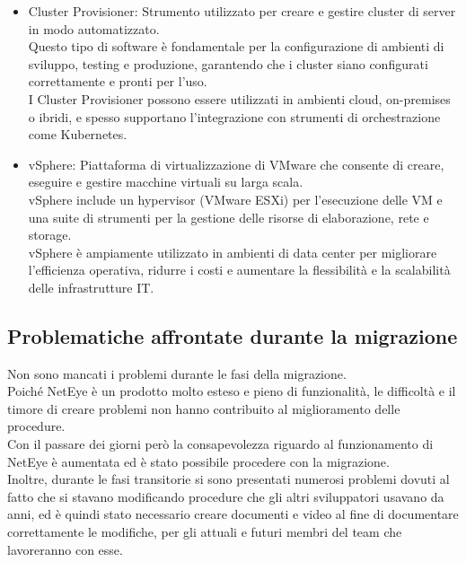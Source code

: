 \begin{itemize}
  \item Cluster Provisioner: Strumento utilizzato per creare e gestire cluster
    di server in modo automatizzato.\\ Questo tipo di software è fondamentale
    per la configurazione di ambienti di sviluppo, testing e produzione,
    garantendo che i cluster siano configurati correttamente e pronti per l'uso.\\
    I Cluster Provisioner possono essere utilizzati in ambienti cloud, on-premises
    o ibridi, e spesso supportano l'integrazione con strumenti di orchestrazione
    come Kubernetes.

  \item vSphere: Piattaforma di virtualizzazione di VMware che consente di
    creare, eseguire e gestire macchine virtuali su larga scala.\\ vSphere include
    un hypervisor (VMware ESXi) per l'esecuzione delle VM e una suite di strumenti
    per la gestione delle risorse di elaborazione, rete e storage.\\ vSphere è
    ampiamente utilizzato in ambienti di data center per migliorare l'efficienza
    operativa, ridurre i costi e aumentare la flessibilità e la scalabilità delle
    infrastrutture IT.
\end{itemize}

\subsection{Problematiche affrontate durante la migrazione}
\label{sub:problemi}

Non sono mancati i problemi durante le fasi della migrazione.\\ Poiché NetEye è un
prodotto molto esteso e pieno di funzionalità, le difficoltà e il timore di
creare problemi non hanno contribuito al miglioramento delle procedure.\\ Con il
passare dei giorni però la consapevolezza riguardo al funzionamento di NetEye è
aumentata ed è stato possibile procedere con la migrazione.\\ Inoltre, durante le
fasi transitorie si sono presentati numerosi problemi dovuti al fatto che si stavano
modificando procedure che gli altri sviluppatori usavano da anni, ed è quindi
stato necessario creare documenti e video al fine di documentare correttamente
le modifiche, per gli attuali e futuri membri del team che lavoreranno con esse.